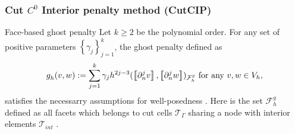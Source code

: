 \begin{frame}
\frametitle{ Cut $C^0$ Interior penalty method (CutCIP) }


\begin{block}{Face-based ghost penalty}
    Let $k\ge 2$ be the polynomial order.
    For any set of positive parameters $\left\{ \gamma _{j} \right\} _{j=1}^{k}$, the ghost penalty defined as \[
    g^{}_{h}( v,w)  := \sum_{j=1}^{k} \gamma _{j} h^{2j-3}_{} ( \jump{ \partial ^{j}_{n} v }, \jump{ \partial ^{j}_{n} w }  ) _{\mathcal{F} _{h}^{g}} \text{ for any } v,w \in V_{h},
    \]
    satisfies the necessarry assumptions for well-posedness \footnotemark[1].
    Here is the set $\mathcal{F} _{h}^{g}$ defined as all facets which belongs to cut cells $\mathcal{T} _{\Gamma }$ sharing a node with interior elements $\mathcal{T} _{int }$ .

\end{block}


\end{frame}


